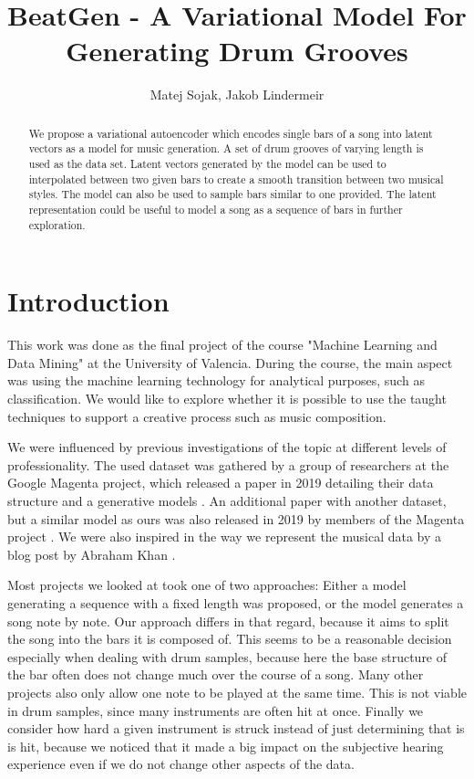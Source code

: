 \documentclass[journal]{Imperial_lab_report}
\begin{document}
\title{BeatGen - A Variational Model For Generating Drum Grooves}
\author{Matej Sojak, Jakob Lindermeir}
\maketitle

\begin{abstract}
    We propose a variational autoencoder which encodes single bars of a song into latent vectors as a model for music generation. A set of drum grooves of varying length is used as the data set. Latent vectors generated by the model can be used to interpolated between two given bars to create a smooth transition between two musical styles. The model can also be used to sample bars similar to one provided. The latent representation could be useful to model a song as a sequence of bars in further exploration.
\end{abstract}

\section{Introduction}
This work was done as the final project of the course "Machine Learning and Data Mining" at the University of Valencia. During the course, the main aspect was using the machine learning technology for analytical purposes, such as classification. We would like to explore whether it is possible to use the taught techniques to support a creative process such as music composition.

We were influenced by previous investigations of the topic at different levels of professionality. The used dataset was gathered by a group of researchers at the Google Magenta project, which released a paper in 2019 detailing their data structure and  a generative models \cite{DBLP:journals/corr/abs-1905-06118}. An additional paper with another dataset, but a similar model as ours was also released in 2019 by members of the Magenta project \cite{DBLP:journals/corr/abs-1803-05428}. We were also inspired in the way we represent the musical data by a blog post by Abraham Khan \cite{khan_2018}.

Most projects we looked at took one of two approaches: Either a model generating a sequence with a fixed length was proposed, or the model generates a song note by note. Our approach differs in that regard, because it aims to split the song into the bars it is composed of. This seems to be a reasonable decision especially when dealing with drum samples, because here the base structure of the bar often does not change much over the course of a song. Many other projects also only allow one note to be played at the same time. This is not viable in drum samples, since many instruments are often hit at once. Finally we consider how hard a given instrument is struck instead of just determining that is is hit, because we noticed that it made a big impact on the subjective hearing experience even if we do not change other aspects of the data.
\end{document}
